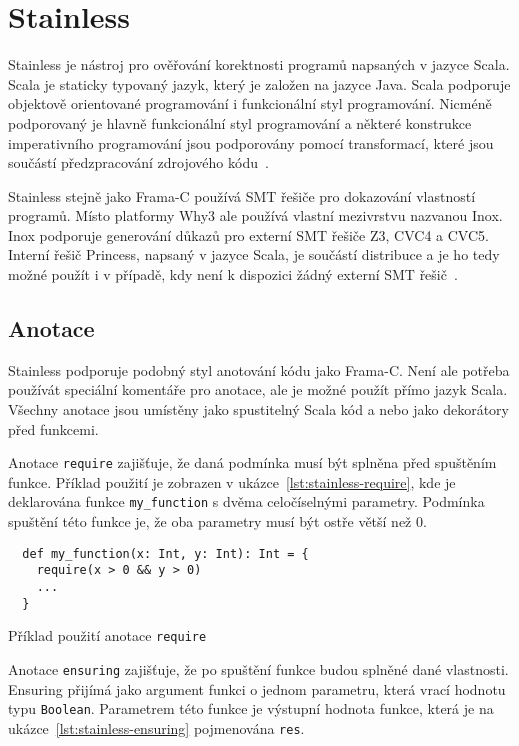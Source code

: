 \chapter{Stainless}
\label{ch:stainless}

Stainless je nástroj pro ověřování korektnosti programů napsaných v jazyce Scala.
Scala je staticky typovaný jazyk, který je založen na jazyce Java.
Scala podporuje objektově orientované programování i funkcionální styl programování.
Nicméně podporovaný je hlavně funkcionální styl programování a některé konstrukce
imperativního programování jsou podporovány pomocí transformací, které jsou součástí
předzpracování zdrojového kódu~\cite{StainlessDocs}.

Stainless stejně jako Frama\mbox{-}C používá SMT řešiče pro dokazování vlastností programů.
Místo platformy Why3 ale používá vlastní mezivrstvu nazvanou Inox.
Inox podporuje generování důkazů pro externí SMT řešiče Z3, CVC4 a CVC5.
Interní řešič Princess, napsaný v jazyce Scala, je součástí distribuce a je ho tedy možné použít
i v případě, kdy není k dispozici žádný externí SMT řešič~\cite{InoxSolver}.

\section{Anotace}
\label{sec:stainless-annotations}

Stainless podporuje podobný styl anotování kódu jako Frama\mbox{-}C\@.
Není ale potřeba používát speciální komentáře pro anotace,
ale je možné použít přímo jazyk Scala.
Všechny anotace jsou umístěny jako spustitelný Scala kód a nebo jako dekorátory před funkcemi.

Anotace \texttt{require} zajišťuje, že daná podmínka musí být splněna před spuštěním funkce.
Příklad použití je zobrazen v ukázce~\ref{lst:stainless-require},
kde je deklarována funkce \texttt{my\_function} s dvěma celočíselnými parametry.
Podmínka spuštění této funkce je, že oba parametry musí být ostře větší než 0.

\begin{listing}[H]
  \begin{verbatim}
  def my_function(x: Int, y: Int): Int = {
    require(x > 0 && y > 0)
    ...
  }
  \end{verbatim}
  \caption{Příklad použití anotace \texttt{require}}
  \label{lst:stainless-require}
\end{listing}

Anotace \texttt{ensuring} zajišťuje, že po spuštění funkce budou splněné dané vlastnosti.
Ensuring přijímá jako argument funkci o jednom parametru,
která vrací hodnotu typu \texttt{Boolean}.
Parametrem této funkce je výstupní hodnota funkce,
která je na ukázce~\ref{lst:stainless-ensuring} pojmenována \texttt{res}.


